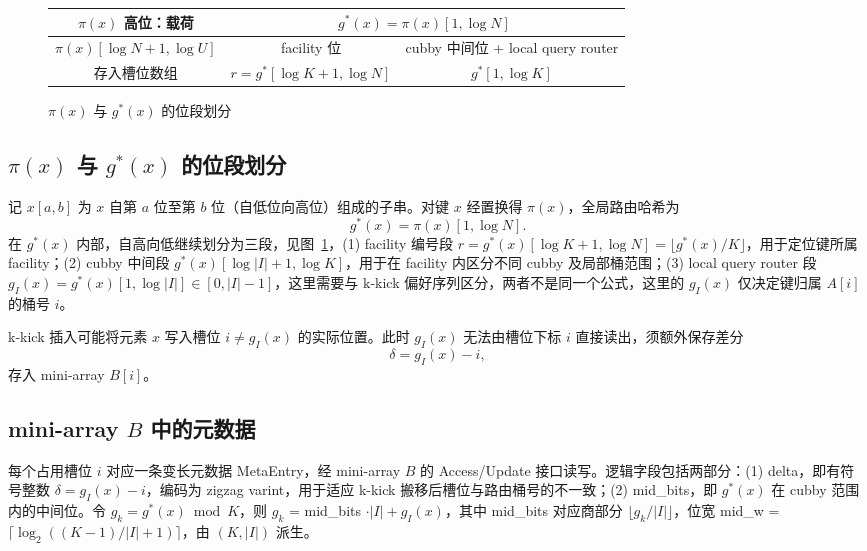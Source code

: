 \begin{figure}[htbp]
  \centering
  \setlength{\tabcolsep}{4pt}
  \small
  \begin{tabular}{|c|c|c|} 
    \hline
    \multicolumn{1}{|c|}{$\pi(x)$ 高位：载荷} &
    \multicolumn{2}{c|}{$g^\ast(x)=\pi(x)[1,\log N]$} \\
    \hline
    $\pi(x)[\log N+1,\log U]$ & facility 位 & cubby 中间位 + local query router \\
    \hline
    存入槽位数组 & $r=g^\ast[\log K+1,\log N]$ & $g^\ast[1,\log K]$ \\
    \hline
  \end{tabular}
  \caption{$\pi(x)$ 与 $g^\ast(x)$ 的位段划分}
  \label{fig:gx-layout}
\end{figure}

\subsection{\texorpdfstring{\(\pi(x)\) 与 \(g^\ast(x)\) 的位段划分}{pi(x) 与 g*(x) 的位段划分}}

记 \(x[a,b]\) 为 \(x\) 自第 \(a\) 位至第 \(b\) 位（自低位向高位）组成的子串。对键 \(x\) 经置换得 \(\pi(x)\)，全局路由哈希为
\begin{equation}
  g^\ast(x)=\pi(x)[1,\log N].
\end{equation}
在 \(g^\ast(x)\) 内部，自高向低继续划分为三段，见图~\ref{fig:gx-layout}，(1) facility 编号段 \(r=g^\ast(x)[\log K+1,\log N]=\lfloor g^\ast(x)/K\rfloor\)，用于定位键所属 facility；(2) cubby 中间段 \(g^\ast(x)[\log|I|+1,\log K]\)，用于在 facility 内区分不同 cubby 及局部桶范围；(3) local query router 段 \(g_I(x)=g^\ast(x)[1,\log|I|]\in[0,|I|-1]\)，这里需要与 k-kick 偏好序列区分，两者不是同一个公式，这里的 \(g_I(x)\) 仅决定键归属 \(A[i]\) 的桶号 \(i\)。

k-kick 插入可能将元素 \(x\) 写入槽位 \(i\neq g_I(x)\) 的实际位置。此时 \(g_I(x)\) 无法由槽位下标 \(i\) 直接读出，须额外保存差分
\begin{equation}
  \delta=g_I(x)-i,
\end{equation}
存入 mini-array \(B[i]\)。

\subsection{mini-array \texorpdfstring{\(B\)}{B} 中的元数据}

每个占用槽位 \(i\) 对应一条变长元数据 MetaEntry，经 mini-array \(B\) 的 Access/Update 接口读写。逻辑字段包括两部分：(1) delta，即有符号整数 \(\delta=g_I(x)-i\)，编码为 zigzag varint，用于适应 k-kick 搬移后槽位与路由桶号的不一致；(2) mid\_bits，即 \(g^\ast(x)\) 在 cubby 范围内的中间位。令 \(g_k=g^\ast(x)\bmod K\)，则 \(g_k\) = mid\_bits \(\cdot|I|+g_I(x)\)，其中 mid\_bits 对应商部分 \(\lfloor g_k/|I|\rfloor\)，位宽 mid\_w = \(\lceil\log_2((K-1)/|I|+1)\rceil\)，由 \((K,|I|)\) 派生。

